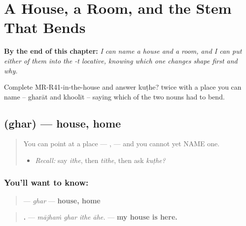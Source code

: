 
\chapter{A House, a Room, and the Stem That Bends}
\label{ch:mr-the-oblique-stem}

\begin{chapteropening}
\textbf{By the end of this chapter:} \emph{I can name a house and a room, and I can put either of them into the -t locative, knowing which one changes shape first and why.}

Complete MR-R41-in-the-house and answer kuṭhe? twice with a place you can name -- gharāt and khoolīt -- saying which of the two nouns had to bend.
\end{chapteropening}

\section[\texorpdfstring{\mr{घर} (ghar)}{घर (ghar)}]{ (ghar) — house, home}

\label{lesson:MR-C41-ghar}



\begin{quote}
You can point at a place — \textbf{}, \textbf{} — and you cannot yet NAME one.

\begin{itemize}
\raggedright
  \item \emph{Recall:} say \emph{ithe}, then \emph{tithe}, then ask \emph{kuṭhe?}
\end{itemize}
\end{quote}

\subsection*{You'll want to know: }
\begin{quote}
\textbf{} — \emph{ghar} — \textbf{house, home}
\end{quote}

\begin{quote}
\textbf{   .} — \emph{mājhaṁ ghar ithe āhe.} — \textbf{my house is here.}
\end{quote}

